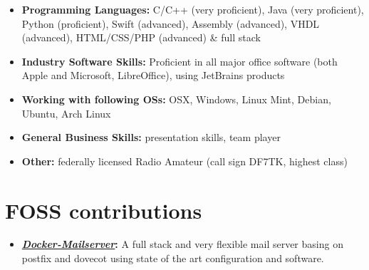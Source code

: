\documentclass[11pt,a4paper,sans]{moderncv}        %
\begin{document}
\begin{itemize}

\item \textbf{Programming Languages:}  C/C++ (very proficient), Java (very proficient), Python (proficient), Swift (advanced), Assembly (advanced), VHDL (advanced), HTML/CSS/PHP (advanced) \& full stack

\vspace{6pt}



\item \textbf{Industry Software Skills:} Proficient in all major office software (both Apple and Microsoft, LibreOffice), using JetBrains products

\vspace{6pt}

\item \textbf{Working with following OSs:}  OSX, Windows, Linux Mint, Debian, Ubuntu, Arch Linux

\vspace{6pt}

\item \textbf{General Business Skills:} presentation skills, team player

\vspace{6pt}

\item \textbf{Other:} federally licensed Radio Amateur (call sign DF7TK, highest class)

\end{itemize}

\section{FOSS contributions}

\vspace{6pt}

\begin{itemize}

\item{\textbf{\href{https://github.com/tomav/docker-mailserver/}{\textit{Docker-Mailserver}}:}
\vspace{2pt}
\small{A full stack and very flexible mail server basing on postfix and dovecot using state of the art configuration and software.}}

\end{itemize}
\end{document}
